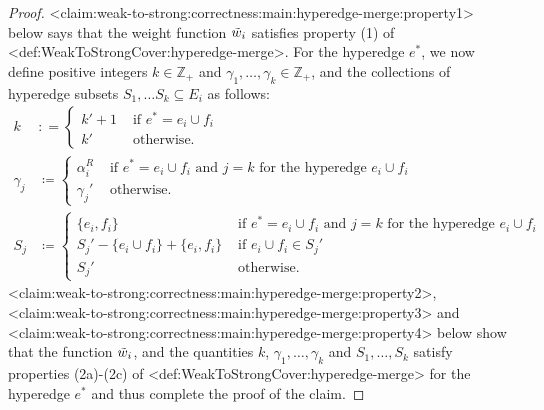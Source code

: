 \documentclass{article}
\def\Cref#1{<#1>}%
\providecommand{\Z}{\mathbb{Z}}
\begin{document}
\begin{proof}
    \Cref{claim:weak-to-strong:correctness:main:hyperedge-merge:property1} below says that the weight function $\Tilde{w}_i$ satisfies property (1) of \Cref{def:WeakToStrongCover:hyperedge-merge}. For the hyperedge $e^*$, we now define positive integers $k \in \Z_+$ and $\gamma_1, \ldots, \gamma_{k} \in \Z_+$, and the collections of hyperedge subsets $S_1, \ldots S_{k} \subseteq E_{i}$ as follows:
    \begin{align*}
        k &: =\begin{cases}
            k' + 1& \text{ if } e^* = e_i\cup f_i\\
            k'&\text{ otherwise.}
        \end{cases}&\\
        \gamma_j&\coloneqq  \begin{cases}
            \alpha_i^R& \text{ if } e^* = e_i\cup f_i \text{ and } j = k \text{ for the hyperedge $e_i\cup f_i$}\\
            \gamma_j'&\text{ otherwise}.
        \end{cases}&\\
        S_j& \coloneqq  \begin{cases}
            \{e_i, f_i\}&\text{ if } e^* = e_i\cup f_i \text{ and } j = k \text{ for the hyperedge $e_i\cup f_i$}\\
            S_j' - \{e_i\cup f_i\} + \{e_i, f_i\}&\text{ if } e_i\cup f_i \in S_j'\\
            S_j'& \text{ otherwise.}
        \end{cases}&
    \end{align*}
    \Cref{claim:weak-to-strong:correctness:main:hyperedge-merge:property2}, \Cref{claim:weak-to-strong:correctness:main:hyperedge-merge:property3} and \Cref{claim:weak-to-strong:correctness:main:hyperedge-merge:property4} below show that the function $\Tilde{w}_i$, and the quantities $k$, $\gamma_1, \ldots, \gamma_k$ and $S_1, \ldots, S_k$ satisfy properties (2a)-(2c) of \Cref{def:WeakToStrongCover:hyperedge-merge} for the hyperedge $e^*$ and thus complete the proof of the claim.
\end{proof}
\end{document}
